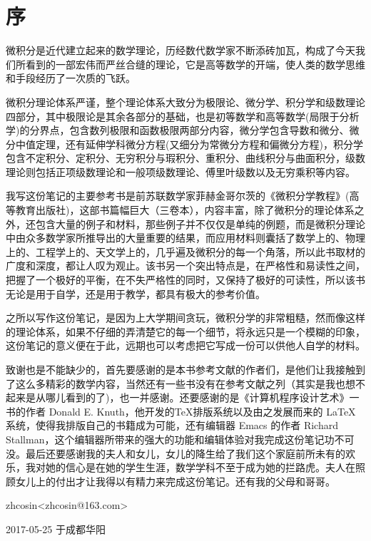 
\chapter*{序}

微积分是近代建立起来的数学理论，历经数代数学家不断添砖加瓦，构成了今天我们所看到的一部宏伟而严丝合缝的理论，它是高等数学的开端，使人类的数学思维和手段经历了一次质的飞跃。

微积分理论体系严谨，整个理论体系大致分为极限论、微分学、积分学和级数理论四部分，其中极限论是其余各部分的基础，也是初等数学和高等数学(局限于分析学)的分界点，包含数列极限和函数极限两部分内容，微分学包含导数和微分、微分中值定理，还有延伸学科微分方程(又细分为常微分方程和偏微分方程)，积分学包含不定积分、定积分、无穷积分与瑕积分、重积分、曲线积分与曲面积分，级数理论则包括正项级数理论和一般项级数理论、傅里叶级数以及无穷乘积等内容。

我写这份笔记的主要参考书是前苏联数学家菲赫金哥尔茨的《微积分学教程》(高等教育出版社)，这部书篇幅巨大（三卷本），内容丰富，除了微积分的理论体系之外，还包含大量的例子和材料，那些例子并不仅仅是单纯的例题，而是微积分理论中由众多数学家所推导出的大量重要的结果，而应用材料则囊括了数学上的、物理上的、工程学上的、天文学上的，几乎遍及微积分的每一个角落，所以此书取材的广度和深度，都让人叹为观止。该书另一个突出特点是，在严格性和易读性之间，把握了一个极好的平衡，在不失严格性的同时，又保持了极好的可读性，所以该书无论是用于自学，还是用于教学，都具有极大的参考价值。

之所以写作这份笔记，是因为上大学期间贪玩，微积分学的非常粗糙，然而像这样的理论体系，如果不仔细的弄清楚它的每一个细节，将永远只是一个模糊的印象，这份笔记的意义便在于此，远期也可以考虑把它写成一份可以供他人自学的材料。

致谢也是不能缺少的，首先要感谢的是本书参考文献的作者们，是他们让我接触到了这么多精彩的数学内容，当然还有一些书没有在参考文献之列（其实是我也想不起来是从哪儿看到的了)，也一并感谢。还要感谢的是《计算机程序设计艺术》一书的作者 Donald E. Knuth，他开发的\TeX 排版系统以及由之发展而来的 \LaTeX 系统，使得我排版自己的书籍成为可能，还有编辑器 Emacs 的作者 Richard Stallman，这个编辑器所带来的强大的功能和编辑体验对我完成这份笔记功不可没。最后还要感谢我的夫人和女儿，女儿的降生给了我们这个家庭前所未有的欢乐，我对她的信心是在她的学生生涯，数学学科不至于成为她的拦路虎。夫人在照顾女儿上的付出才让我得以有精力来完成这份笔记。还有我的父母和哥哥。

\vspace{1.5cm}

\hfill zhcosin<zhcosin@163.com> \hspace{0.2em}

\hfill 2017-05-25 于成都华阳 \hspace{1.5em}


